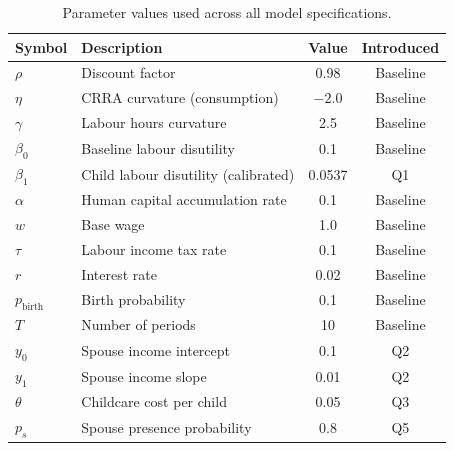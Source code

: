 \begin{table}[H]
\centering
\renewcommand{\arraystretch}{1.3}
\begin{tabular}{llcc}
\hline
\textbf{Symbol} & \textbf{Description} & \textbf{Value} & \textbf{Introduced} \\
\hline
$\rho$               & Discount factor                          & 0.98    & Baseline \\
$\eta$               & CRRA curvature (consumption)             & $-2.0$  & Baseline \\
$\gamma$             & Labour hours curvature                   & 2.5     & Baseline \\
$\beta_0$            & Baseline labour disutility               & 0.1     & Baseline \\
$\beta_1$            & Child labour disutility (calibrated)     & 0.0537  & Q1 \\
$\alpha$             & Human capital accumulation rate          & 0.1     & Baseline \\
$w$                  & Base wage                                & 1.0     & Baseline \\
$\tau$               & Labour income tax rate                   & 0.1     & Baseline \\
$r$                  & Interest rate                            & 0.02    & Baseline \\
$p_{\text{birth}}$   & Birth probability                        & 0.1     & Baseline \\
$T$                  & Number of periods                        & 10      & Baseline \\
$y_0$                & Spouse income intercept                  & 0.1     & Q2 \\
$y_1$                & Spouse income slope                      & 0.01    & Q2 \\
$\theta$             & Childcare cost per child                 & 0.05    & Q3 \\
$p_s$                & Spouse presence probability              & 0.8     & Q5 \\
\hline
\end{tabular}
\caption{Parameter values used across all model specifications.}
\label{tab:parameters}
\end{table}

